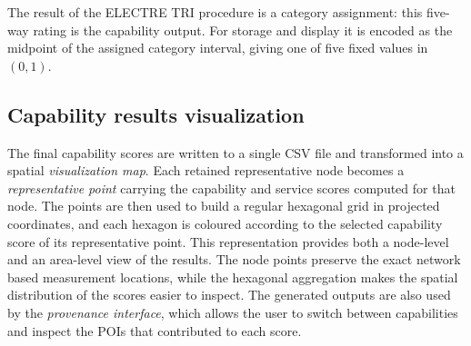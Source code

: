 \documentclass{article}
\begin{document}
The result of the ELECTRE TRI procedure is a category assignment: this
five-way rating is the capability output. For storage and display it is
encoded as the midpoint of the assigned category interval, giving one of
five fixed values in \((0,1)\).

\subsection{Capability results visualization}
The final capability scores are written to a single CSV file and transformed into a
spatial \emph{visualization map}. Each retained representative node becomes a \emph{representative point}
carrying the capability and service scores computed for that node. The points are then used to build a regular hexagonal grid in projected coordinates, and each hexagon is coloured according to the
selected capability score of its representative point.
This representation provides both a node-level and an area-level view of
the results. The node points preserve the exact network based measurement
locations, while the hexagonal aggregation makes the spatial distribution of
the scores easier to inspect. The generated outputs are also used by the
\emph{provenance interface}, which allows the user to switch between
capabilities and inspect the POIs that contributed to each score.
\end{document}
